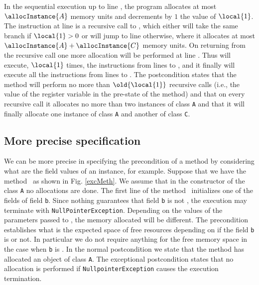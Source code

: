 In the sequential execution up to line , the program allocates at most $\allocInstance{A}$ memory units and decrements by $1$ the value of $\local{1}$. The instruction at line  is a recursive call to \methodd{}, which either will take the same branch if $\local{1} > 0 $ or will jump to line  otherwise, where it allocates at most $\allocInstance{A} +  \allocInstance{C}$ memory units. On returning from the recursive call one more allocation will be performed at line .
 Thus \methodd{} will execute, $\local{1}$ times, the instructions from lines  to , 
and it finally will execute all the instructions from lines   to .
The postcondition states that the method will perform no more
than $\old{\local{1}}$ recursive calls (i.e., the value of the register variable in the pre-state of the method) and that on every recursive call it allocates no more than two instances of class \texttt{A} and that it will finally allocate one instance of class \texttt{A} and another of class \texttt{C}.


\subsection{More precise specification} We can be more precise in specifying the precondition of a method by considering what are the field values of an instance, for example. Suppose that we have the method \method\ as shown in Fig. \ref{excMeth}. We assume that in the constructor of the class \texttt{A} no allocations are done. The first line of the method \method\ initializes one of the fields of field \texttt{b}. Since nothing guarantees that field \texttt{b} is not \Mynull, the execution may terminate with
\texttt{NullPointerException}. Depending on the values of the parameters passed to \method, the memory allocated will be different. The precondition establishes what is the expected space of free resources depending on if the field
\texttt{b} is \Mynull  or not. In particular we do not require anything for
the free memory space in the case when \texttt{b} is \Mynull. In the
normal postcondition we state that the method has allocated an
object of class \texttt{A}. The exceptional postcondition states
that no allocation is performed if \texttt{NullpointerException} causes the execution termination.

